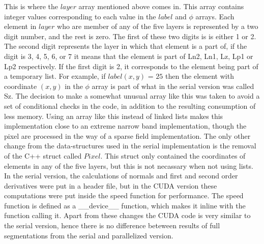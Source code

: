 This is where the $layer$ array mentioned above comes in. This array contains integer values corresponding to each value in the $label$ and $\phi$ arrays. Each element in $layer$ who are member of any of the five layers is represented by a two digit number, and the rest is zero. The first of these two digits is is either 1 or 2. The second digit represents the layer in which that element is a part of, if the digit is 3, 4, 5, 6, or 7 it means that the element is part of Ln2, Ln1, Lz, Lp1 or Lp2 respectively. If the first digit is 2, it corresponds to the element being part of a temporary list. For example, if $label(x,y)$ = $25$ then the element with coordinate $(x,y)$ in the $\phi$ array is part of what in the serial version was called Sz. The decision to make a somewhat unusual array like this was taken to avoid a set of conditional checks in the code, in addition to the resulting consumption of less memory. Using an array like this instead of linked lists makes this implementation close to an extreme narrow band implementation, though the pixel are processed in the way of a sparse field implementation. The only other change from the data-structures used in the serial implementation is the removal of the C++ struct called $Pixel$. This struct only contained the coordinates of elements in any of the five layers, but this is not necassary when not using lists. In the serial version, the calculations of normals and first and second order derivatives were put in a header file, but in the CUDA version these computations were put inside the speed function for performance. The speed function is defined as a \_\_device\_\_ function, which makes it inline with the function calling it. Apart from these changes the CUDA code is very similar to the serial version, hence there is no difference beteween results of full segmentations from the serial and parallelized version.

